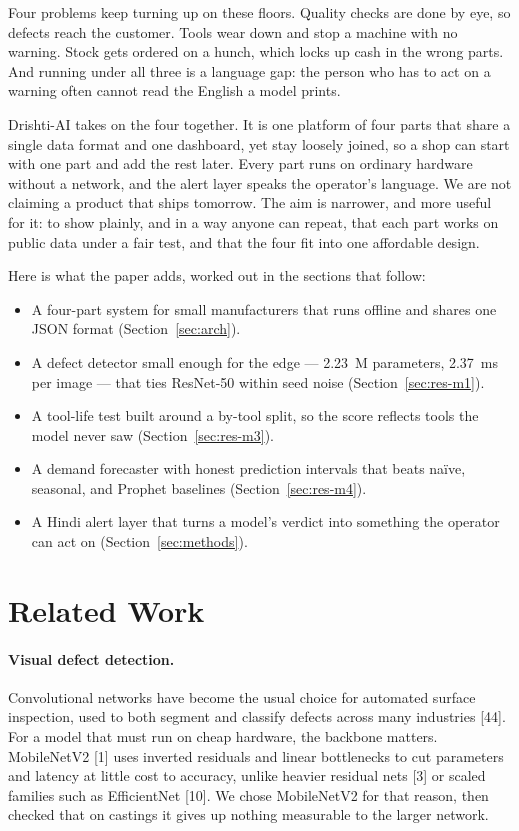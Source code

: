 \documentclass[12pt]{article}
\begin{document}
Four problems keep turning up on these floors. Quality checks are done by eye, so
defects reach the customer. Tools wear down and stop a machine with no warning.
Stock gets ordered on a hunch, which locks up cash in the wrong parts. And running
under all three is a language gap: the person who has to act on a warning often
cannot read the English a model prints.

Drishti-AI takes on the four together. It is one platform of four parts that share
a single data format and one dashboard, yet stay loosely joined, so a shop can
start with one part and add the rest later. Every part runs on ordinary hardware
without a network, and the alert layer speaks the operator's language. We are not
claiming a product that ships tomorrow. The aim is narrower, and more useful for
it: to show plainly, and in a way anyone can repeat, that each part works on public
data under a fair test, and that the four fit into one affordable design.

Here is what the paper adds, worked out in the sections that follow:
\begin{itemize}
  \item A four-part system for small manufacturers that runs offline and shares one
        JSON format (Section~\ref{sec:arch}).
  \item A defect detector small enough for the edge --- 2.23~M parameters, 2.37~ms
        per image --- that ties ResNet-50 within seed noise (Section~\ref{sec:res-m1}).
  \item A tool-life test built around a by-tool split, so the score reflects tools
        the model never saw (Section~\ref{sec:res-m3}).
  \item A demand forecaster with honest prediction intervals that beats naïve,
        seasonal, and Prophet baselines (Section~\ref{sec:res-m4}).
  \item A Hindi alert layer that turns a model's verdict into something the
        operator can act on (Section~\ref{sec:methods}).
\end{itemize}

\section{Related Work}

\paragraph{Visual defect detection.}
Convolutional networks have become the usual choice for automated surface
inspection, used to both segment and classify defects across many industries [44].
For a model that must run on cheap hardware, the backbone matters. MobileNetV2 [1]
uses inverted residuals and linear bottlenecks to cut parameters and latency at
little cost to accuracy, unlike heavier residual nets [3] or scaled families such
as EfficientNet [10]. We chose MobileNetV2 for that reason, then checked that on
castings it gives up nothing measurable to the larger network.
\end{document}
